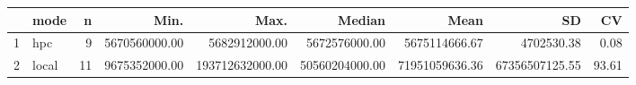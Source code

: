 \begin{table}[ht]
\centering
\begin{tabular}{rlrrrrrrr}
  \hline
 & mode & n & Min. & Max. & Median & Mean & SD & CV \\ 
  \hline
1 & hpc &   9 & 5670560000.00 & 5682912000.00 & 5672576000.00 & 5675114666.67 & 4702530.38 & 0.08 \\ 
  2 & local &  11 & 9675352000.00 & 193712632000.00 & 50560204000.00 & 71951059636.36 & 67356507125.55 & 93.61 \\ 
   \hline
\end{tabular}
\end{table}
